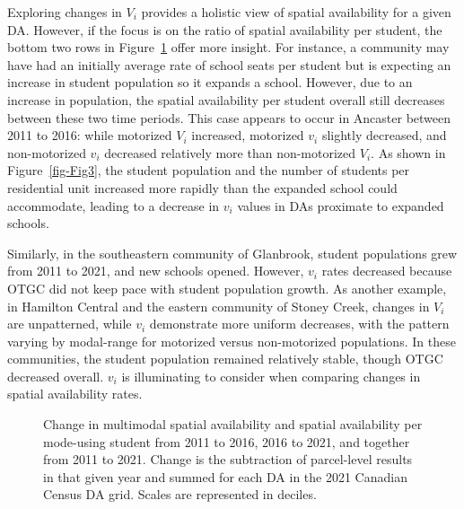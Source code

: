 \documentclass[
default
]{sn-jnl}
\begin{document}
Exploring changes in \(V_i\) provides a holistic view of spatial
availability for a given DA. However, if the focus is on the ratio of
spatial availability per student, the bottom two rows in
Figure~\ref{fig-Fig8} offer more insight. For instance, a community may
have had an initially average rate of school seats per student but is
expecting an increase in student population so it expands a school.
However, due to an increase in population, the spatial availability per
student overall still decreases between these two time periods. This
case appears to occur in Ancaster between 2011 to 2016: while motorized
\(V_i\) increased, motorized \(v_i\) slightly decreased, and
non-motorized \(v_i\) decreased relatively more than non-motorized
\(V_i\). As shown in Figure~\ref{fig-Fig3}, the student population and
the number of students per residential unit increased more rapidly than
the expanded school could accommodate, leading to a decrease in \(v_i\)
values in DAs proximate to expanded schools.

Similarly, in the southeastern community of Glanbrook, student
populations grew from 2011 to 2021, and new schools opened. However,
\(v_i\) rates decreased because OTGC did not keep pace with student
population growth. As another example, in Hamilton Central and the
eastern community of Stoney Creek, changes in \(V_i\) are unpatterned,
while \(v_i\) demonstrate more uniform decreases, with the pattern
varying by modal-range for motorized versus non-motorized populations.
In these communities, the student population remained relatively stable,
though OTGC decreased overall. \(v_i\) is illuminating to consider when
comparing changes in spatial availability rates.

\begin{figure}[H]


\caption{\label{fig-Fig8}Change in multimodal spatial availability and
spatial availability per mode-using student from 2011 to 2016, 2016 to
2021, and together from 2011 to 2021. Change is the subtraction of
parcel-level results in that given year and summed for each DA in the
2021 Canadian Census DA grid. Scales are represented in deciles.}

\end{figure}%
\end{document}
